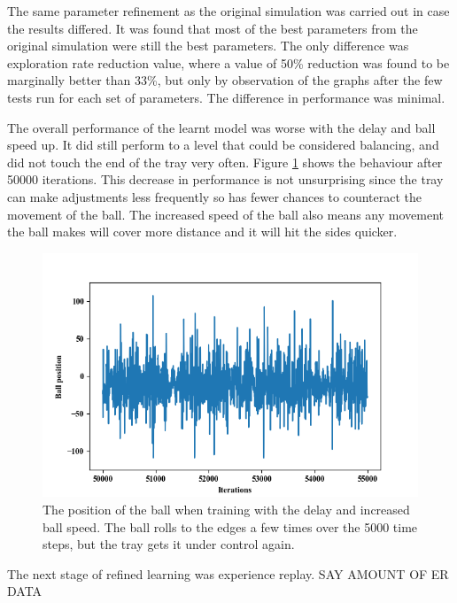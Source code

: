 \documentclass[12pt,a4paper]{article}
\begin{document}
The same parameter refinement as the original simulation was carried out in case the results differed. It was found that most of the best parameters from the original simulation were still the best parameters. The only difference was exploration rate reduction value, where a value of 50\% reduction was found to be marginally better than 33\%, but only by observation of the graphs after the few tests run for each set of parameters. The difference in performance was minimal.

The overall performance of the learnt model was worse with the delay and ball speed up. It did still perform to a level that could be considered balancing, and did not touch the end of the tray very often. Figure \ref{refined_sim_general} shows the behaviour after 50000 iterations. This decrease in performance is not unsurprising since the tray can make adjustments less frequently so has fewer chances to counteract the movement of the ball. The increased speed of the ball also means any movement the ball makes will cover more distance and it will hit the sides quicker.

\begin{figure}[H]
	\includegraphics{195}
	\caption{The position of the ball when training with the delay and increased ball speed. The ball rolls to the edges a few times over the 5000 time steps, but the tray gets it under control again. }
	\label{refined_sim_general}
\end{figure}

The next stage of refined learning was experience replay. SAY AMOUNT OF ER DATA
\end{document}
